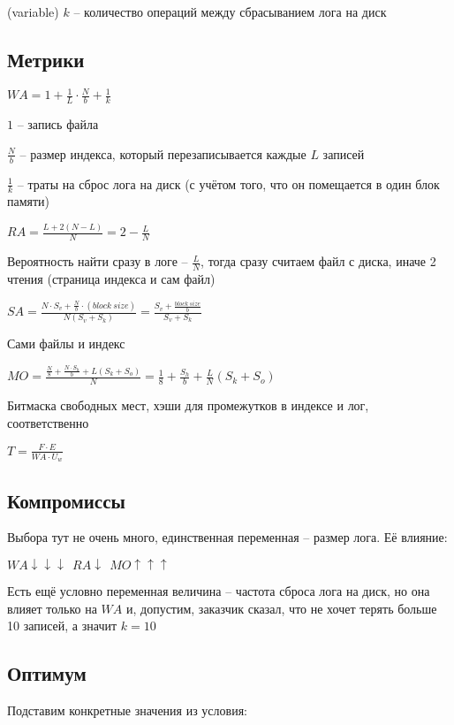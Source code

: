 (variable) $k$ -- количество операций между сбрасыванием лога на диск

\subsection*{Метрики}

\large$WA = 1 + \frac{1}{L}\cdot\frac{N}{b} + \frac{1}{k}$\normalsize

$1$ -- запись файла

$\frac{N}{b}$ -- размер индекса, который перезаписывается каждые $L$ записей

$\frac{1}{k}$ -- траты на сброс лога на диск (с учётом того, что он помещается в один блок памяти)

\large$RA = \frac{L + 2(N-L)}{N} = 2 - \frac{L}{N}$\normalsize

Вероятность найти сразу в логе -- $\frac{L}{N}$, тогда сразу считаем файл с диска, иначе 2 чтения (страница индекса и сам файл)

\large$SA = \frac{N\cdot S_v + \frac{N}{b}\cdot (block\ size)}{N(S_v + S_k)} = \frac{S_v + \frac{block\ size}{b}}{S_v + S_k}$\normalsize

Сами файлы и индекс

\large$MO = \frac{\frac{N}{8} + \frac{N\cdot S_h}{b} + L(S_k + S_o)}{N} = \frac{1}{8} + \frac{S_h}{b} + \frac{L}{N}(S_k + S_o)$\normalsize

Битмаска свободных мест, хэши для промежутков в индексе и лог, соответственно

\large$T = \frac{F\cdot E}{WA\cdot U_w}$\normalsize

\subsection*{Компромиссы}

Выбора тут не очень много, единственная переменная -- размер лога. Её влияние:

$WA\downarrow\downarrow\downarrow\ \ RA \downarrow\ \ MO \uparrow\uparrow\uparrow$

Есть ещё условно переменная величина -- частота сброса лога на диск, но она влияет только на $WA$ и, допустим, заказчик сказал, что не хочет терять больше 10 записей, а значит $k = 10$

\subsection*{Оптимум}

Подставим конкретные значения из условия:

